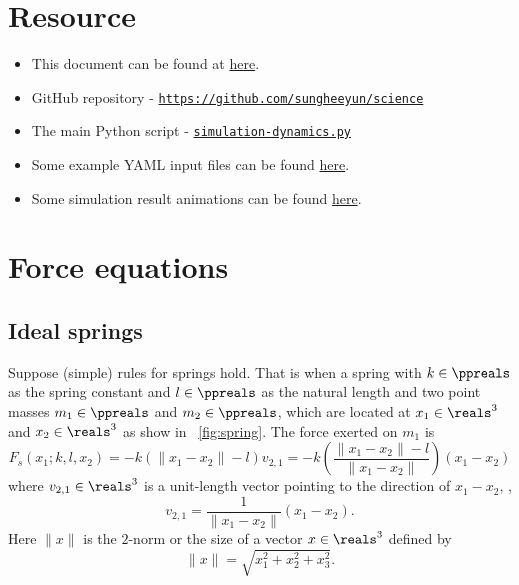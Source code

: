 \documentclass{article}
\begin{document}
\section{Resource}

\begin{itemize}
\item
	This document can be found at \href{https://github.com/sungheeyun/science/blob/main/docs/dynamics-equations.pdf}{here}.

\item
	GitHub repository - {\tt \href{https://github.com/sungheeyun/science}{https://github.com/sungheeyun/science}}

\item
	The main Python script - {\tt \href{https://github.com/sungheeyun/science/blob/main/bin/simulation-dynamics.py}{simulation-dynamics.py}}

\item
	Some example YAML input files can be found \href{https://github.com/sungheeyun/science/tree/main/data/input}{here}.

\item
	Some simulation result animations can be found \href{https://github.com/sungheeyun/science/tree/main/animations}{here}.
\end{itemize}


\section{Force equations}

\subsection{Ideal springs}

Suppose (simple) rules for springs hold. That is when a spring with $k\in\ppreals$ as the spring constant and $l\in\ppreals$ as the natural length
and two point masses $m_1\in\ppreals$ and $m_2\in\ppreals$, which are located at
$x_1\in\reals^3$
and
$x_2\in\reals^3$
as show in \figurename~\ref{fig:spring}.
The force exerted on $m_1$ is
\begin{equation}
\label{eq:force:spring}
	F_s(x_1;k,l,x_2) = -k (\|x_1-x_2\| - l) v_{2,1}
	= -k
	\left(
	\frac{\|x_1-x_2\| - l}{\|x_1-x_2\|}
	\right)
	(x_1-x_2)
\end{equation}
where $v_{2,1}\in\reals^3$ is a unit-length vector pointing to the direction of $x_1-x_2$,
\ie,
\[
	v_{2,1} =
	\frac{1}{\|x_1-x_2\|}
	(x_1-x_2).
\]
Here $\|x\|$ is the $2$-norm or the size of a vector $x\in\reals^3$ defined by
\[
	\|x\| = \sqrt{x_1^2+x_2^2+x_3^2}.
\]
\end{document}
